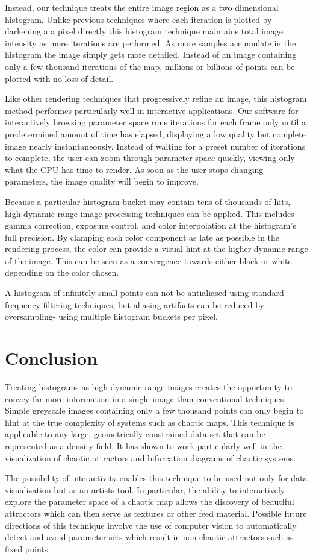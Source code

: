 \documentclass{acmsiggraph}
\begin{document}
Instead, our technique treats the entire image region as a two dimensional
histogram. Unlike previous techniques where each iteration is plotted by
darkening a a pixel directly this histogram technique maintains total image
intensity as more iterations are performed. As more samples accumulate in the
histogram the image simply gets more detailed. Instead of an image containing
only a few thousand iterations of the map, millions or billions of points can
be plotted with no loss of detail.

Like other rendering techniques that progressively refine an image, this
histogram method performes particularly well in interactive applications.
Our software for interactively browsing parameter space runs iterations
for each frame only until a predetermined amount of time has elapsed,
displaying a low quality but complete image nearly instantaneously.
Instead of waiting for a preset number of iterations to complete, the user
can zoom through parameter space quickly, viewing only what the CPU has time
to render. As soon as the user stops changing parameters, the image quality
will begin to improve.

Because a particular histogram bucket may contain tens of thousands of hits,
high-dynamic-range image processing techniques can be applied. This includes
gamma correction, exposure control, and color interpolation at the histogram's
full precision. By clamping each color component as late as possible in the
rendering process, the color can provide a visual hint at the higher
dynamic range of the image. This can be seen as a convergence towards either
black or white depending on the color chosen.

A histogram of infinitely small points can not be antialiased using standard
frequency filtering techniques, but aliasing artifacts can be reduced by
oversampling- using multiple histogram buckets per pixel.

\section{Conclusion}
Treating histograms as high-dynamic-range images creates the opportunity to
convey far more information in a single image than conventional techniques.
Simple greyscale images containing only a few thousand points can only begin
to hint at the true complexity of systems such as chaotic maps. This technique
is applicable to any large, geometrically constrained data set that can be
represented as a density field. It has shown to work particularly well in
the visualization of chaotic attractors and bifurcation diagrams of chaotic
systems.

The possibility of interactivity enables this technique to be used not only
for data visualization but as an artists tool. In particular, the ability
to interactively explore the parameter space of a chaotic map allows the
discovery of beautiful attractors which can then serve as textures or other
feed material. Possible future directions of this technique involve the use
of computer vision to automatically detect and avoid parameter sets which
result in non-chaotic attractors such as fixed points.
\end{document}
